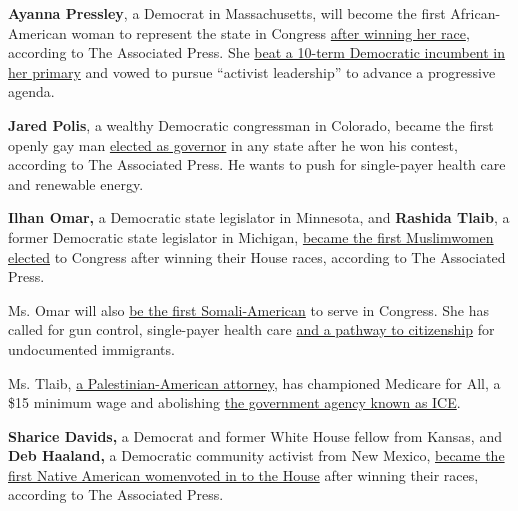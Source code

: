 \textbf{Ayanna Pressley}, a Democrat in Massachusetts, will become the
first African-American woman to represent the state in Congress
\href{https://www.nytimes.com/interactive/2018/11/06/us/elections/results-massachusetts-elections.html}{after
winning her race}, according to The Associated Press. She
\href{https://www.nytimes.com/2018/09/04/us/politics/ayanna-pressley-massachusetts.html}{beat
a 10-term Democratic incumbent in her primary} and vowed to pursue
``activist leadership'' to advance a progressive agenda.

\textbf{Jared Polis}, a wealthy Democratic congressman in Colorado,
became the first openly gay man
\href{https://www.nytimes.com/interactive/2018/11/06/us/elections/results-colorado-elections.html}{elected
as governor} in any state after he won his contest, according to The
Associated Press. He wants to push for single-payer health care and
renewable energy.

\textbf{Ilhan Omar,} a Democratic state legislator in Minnesota, and
\textbf{Rashida Tlaib}, a former Democratic state legislator in
Michigan,
\href{https://www.nytimes.com/interactive/2018/11/06/us/elections/results-minnesota-elections.html}{became
the first
Muslim}\href{https://www.nytimes.com/elections/results/michigan-house-district-13}{women
elected} to Congress after winning their House races, according to The
Associated Press.

Ms. Omar will also
\href{https://www.nytimes.com/reuters/2018/10/31/world/africa/31reuters-usa-election-minnesota.html}{be
the first Somali-American} to serve in Congress. She has called for gun
control, single-payer health care
\href{https://www.ilhanomar.com/immigration/}{and a pathway to
citizenship} for undocumented immigrants.

Ms. Tlaib,
\href{https://www.nytimes.com/2018/08/14/us/politics/rashida-tlaib-muslim-congress.html}{a
Palestinian-American attorney}, has championed Medicare for All, a \$15
minimum wage and abolishing
\href{https://www.nytimes.com/2018/07/03/us/politics/fact-check-ice-immigration-abolish.html}{the
government agency known as ICE}.

\textbf{Sharice Davids,} a Democrat and former White House fellow from
Kansas, and \textbf{Deb Haaland,} a Democratic community activist from
New Mexico,
\href{https://www.nytimes.com/elections/results/kansas-house-district-3}{became
the first Native American
women}\href{https://www.nytimes.com/elections/results/michigan-house-district-13}{voted
in to the House} after winning their races, according to The Associated
Press.

